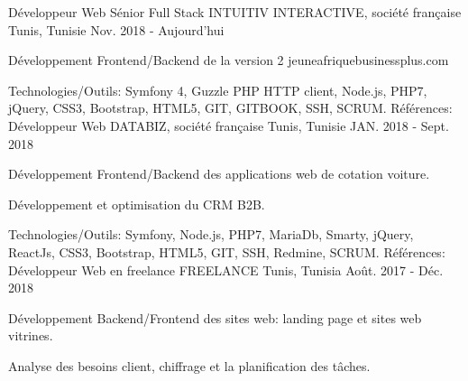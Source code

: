 \begin{cventries}
  \techentries
    {Développeur Web  Sénior Full Stack}
    {INTUITIV INTERACTIVE, société française}
    {Tunis, Tunisie}
    {Nov. 2018 - Aujourd'hui}
    {
      \begin{cvitems}
        \item {Développement Frontend/Backend de la version 2 jeuneafriquebusinessplus.com}    
      \end{cvitems}
    }
    {\textcolor{awesome}{Technologies/Outils: } {\color{graytext}}  {Symfony 4, Guzzle PHP HTTP client, Node.js, PHP7, jQuery, CSS3, Bootstrap, HTML5, GIT, GITBOOK, SSH, SCRUM.}}
    {Références:} 
    {
      \href{https://www.jeuneafriquebusinessplus.com/fr/}{} \break
    }
  \techentries
    {Développeur Web}
    {DATABIZ, société française}
    {Tunis, Tunisie}
    {JAN. 2018 - Sept. 2018}
    {
      \begin{cvitems}
		    \item {Développement Frontend/Backend des applications web de cotation voiture.}		
		    \item {Développement et optimisation du CRM B2B.}
      \end{cvitems}
    }
    {\textcolor{awesome}{Technologies/Outils: } {\color{graytext}}  {Symfony, Node.js, PHP7, MariaDb, Smarty, jQuery, ReactJs, CSS3, Bootstrap, HTML5, GIT, SSH, Redmine, SCRUM.}}
    {Références:} 
    {\href{https://www.reprise-citroen.fr/}{} \break
     \href{https://www.reprise-cash-bypeugeot.fr/}{} \break
     \href{https://www.reprise.dsautomobiles.fr/}{}\break
     \href{https://ankaufservice.renault.de/}{}\break
    }
  \techentries
    {Développeur Web en freelance}
    {FREELANCE}
    {Tunis, Tunisia}
    {Août. 2017 - Déc. 2018}
    {
      \begin{cvitems}
        \item {Développement Backend/Frontend des sites web: landing page et sites web vitrines.}
        \item {Analyse des besoins client, chiffrage et la planification des tâches.}

\end{cvitems}}
\end{cventries}
